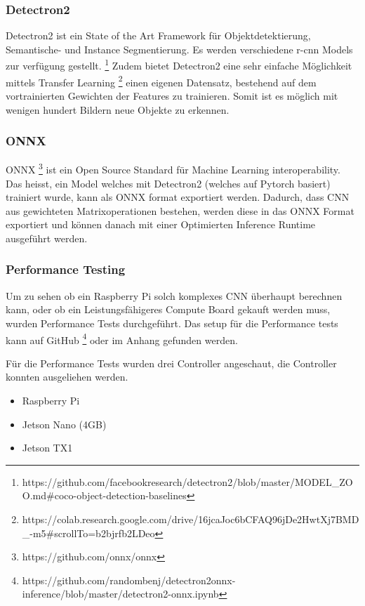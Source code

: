 \subsubsection{Detectron2}

Detectron2 \cite{wu2019detectron2} ist ein State of the Art Framework für Objektdetektierung, Semantische- und Instance Segmentierung.
Es werden verschiedene \acrshort{r-cnn} Models zur verfügung gestellt. \footnote{
https://github.com/facebookresearch/detectron2/blob/master/MODEL\_ZOO.md\#coco-object-detection-baselines
}
Zudem bietet Detectron2 eine sehr einfache Möglichkeit mittels Transfer Learning \footnote{https://colab.research.google.com/drive/16jcaJoc6bCFAQ96jDe2HwtXj7BMD_-m5\#scrollTo=b2bjrfb2LDeo}
einen eigenen Datensatz, bestehend auf dem vortrainierten Gewichten der Features zu trainieren.
Somit ist es möglich mit wenigen hundert Bildern neue Objekte zu erkennen.

\subsubsection{ONNX}

ONNX \footnote{https://github.com/onnx/onnx} ist ein Open Source Standard für Machine Learning
interoperability. Das heisst, ein Model welches mit Detectron2 (welches auf Pytorch basiert) trainiert
wurde, kann als ONNX format exportiert werden.
Dadurch, dass \acrshort{CNN} aus gewichteten Matrixoperationen bestehen, werden diese in das ONNX Format
exportiert und können danach mit einer Optimierten Inference Runtime ausgeführt werden.

\subsubsection{Performance Testing}

Um zu sehen ob ein Raspberry Pi solch komplexes \acrshort{CNN} überhaupt berechnen kann, oder ob ein
Leistungsfähigeres Compute Board gekauft werden muss, wurden Performance Tests durchgeführt.
Das setup für die Performance tests kann auf GitHub \footnote{https://github.com/randombenj/detectron2onnx-inference/blob/master/detectron2-onnx.ipynb} oder im Anhang
gefunden werden.

Für die Performance Tests wurden drei Controller angeschaut, die Controller konnten ausgeliehen werden.

\begin{itemize}
    \item Raspberry Pi
    \item Jetson Nano (4GB)
    \item Jetson TX1
\end{itemize}


